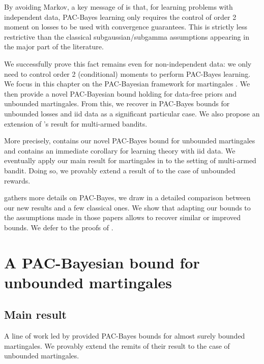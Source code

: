 By avoiding Markov, a key message of \citep{kuzborskij2019efron} is that, for learning problems with independent data, PAC-Bayes learning only requires the control of order 2 moment on losses to be used with convergence guarantees. This is strictly less restrictive than the classical subgaussian/subgamma assumptions appearing in the major part of the literature.

We successfully prove this fact remains even for non-independent data: we only need to control order 2 (conditional) moments to perform PAC-Bayes learning. We focus in this chapter on the PAC-Bayesian framework for martingales \citep{seldin2011pac,seldin2012bandit,seldin2012pac}.
We then provide a novel PAC-Bayesian bound holding for data-free priors and unbounded martingales. From this, we recover in PAC-Bayes bounds for unbounded losses and iid data as a significant particular case. We also propose an extension of \citet{seldin2012bandit}'s result for multi-armed bandits.

More precisely,  contains our novel PAC-Bayes bound for unbounded martingales and  contains an immediate corollary for learning theory with iid data. 
We eventually apply our main result for martingales in  to the setting of multi-armed bandit. Doing so, we provably extend a result of \citet{seldin2012bandit} to the case of unbounded rewards.

 gathers more details on PAC-Bayes,
we draw in  a detailed comparison between our new results and a few classical ones.  We show that adapting our bounds to the assumptions made in those papers allows to recover similar or improved bounds.
We defer to  the proofs of .





\section{A PAC-Bayesian bound for unbounded martingales}

\subsection{Main result}
\label{sec: main_result_mart}
A line of work led by \citet{seldin2011pac,seldin2012bandit,seldin2012pac} provided PAC-Bayes bounds for almost surely bounded martingales. We provably extend the remits of their result to the case of unbounded martingales.

